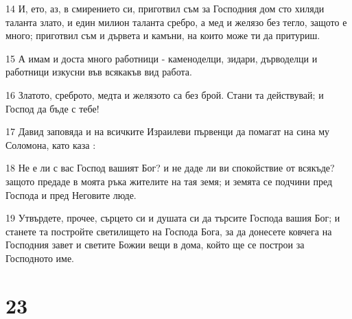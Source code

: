 \par 14 И, ето, аз, в смирението си, приготвил съм за Господния дом сто хиляди таланта злато, и един милион таланта сребро, а мед и желязо без тегло, защото е много; приготвил съм и дървета и камъни, на които може ти да притуриш.
\par 15 А имам и доста много работници - каменоделци, зидари, дърводелци и работници изкусни във всякакъв вид работа.
\par 16 Златото, среброто, медта и желязото са без брой. Стани та действувай; и Господ да бъде с тебе!
\par 17 Давид заповяда и на всичките Израилеви първенци да помагат на сина му Соломона, като каза :
\par 18 Не е ли с вас Господ вашият Бог? и не даде ли ви спокойствие от всякъде? защото предаде в моята ръка жителите на тая земя; и земята се подчини пред Господа и пред Неговите люде.
\par 19 Утвърдете, прочее, сърцето си и душата си да търсите Господа вашия Бог; и станете та постройте светилището на Господа Бога, за да донесете ковчега на Господния завет и светите Божии вещи в дома, който ще се построи за Господното име.

\chapter{23}

